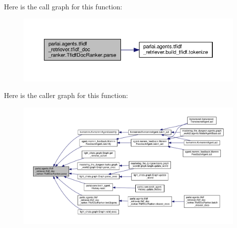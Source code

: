 Here is the call graph for this function\+:
\nopagebreak
\begin{figure}[H]
\begin{center}
\leavevmode
\includegraphics[width=350pt]{classparlai_1_1agents_1_1tfidf__retriever_1_1tfidf__doc__ranker_1_1TfidfDocRanker_a44274f0f828a51c50c641317663e56eb_cgraph}
\end{center}
\end{figure}
Here is the caller graph for this function\+:
\nopagebreak
\begin{figure}[H]
\begin{center}
\leavevmode
\includegraphics[width=350pt]{classparlai_1_1agents_1_1tfidf__retriever_1_1tfidf__doc__ranker_1_1TfidfDocRanker_a44274f0f828a51c50c641317663e56eb_icgraph}
\end{center}
\end{figure}
\mbox{\label{classparlai_1_1agents_1_1tfidf__retriever_1_1tfidf__doc__ranker_1_1TfidfDocRanker_ac6d8b86317616a64f5bc7f8f607dd997}} 

